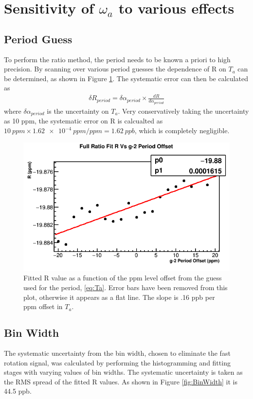 \section{Sensitivity of \texorpdfstring{$\omega_{a}$}{} to various effects}

	\subsection{\gmtwo Period Guess}

		To perform the ratio method, the \gmtwo period needs to be known a priori to high precision. By scanning over various \gmtwo period guesses the dependence of R on $T_{a}$ can be determined, as shown in Figure \ref{fig:gm2PeriodGuess}. The systematic error can then be calculated as 
			\begin{align}
				\delta R_{period} = \delta\alpha_{period} \times \frac{dR}{d\alpha_{period}}
			\end{align}
		where $\delta\alpha_{period}$ is the uncertainty on $T_{a}$. Very conservatively taking the uncertainty as 10 ppm, the systematic error on R is calcualted as $\SI{10}{ppm} \times \SI{1.62e-4}{ppm/ppm} = \SI{1.62}{ppb}$, which is completely negligible.

		\begin{figure}[H]
			\centering
			\includegraphics[width=.6\textwidth]{RatioCBO_R_Vs_gm2PeriodGuess_Canv}
		    \caption[gm2PeriodGuess]{Fitted R value as a function of the ppm level offset from the guess used for the \gmtwo period, \ref{eq:Ta}. Error bars have been removed from this plot, otherwise it appears as a flat line. The slope is .16 ppb per ppm offset in $T_{a}$.}
		    \label{fig:gm2PeriodGuess}
		\end{figure}


	\subsection{Bin Width}

		The systematic uncertainty from the bin width, chosen to eliminate the fast rotation signal, was calculated by performing the histogramming and fitting stages with varying values of bin widths. The systematic uncertainty is taken as the RMS spread of the fitted R values. As shown in Figure \ref{fig:BinWidth} it is 44.5 ppb.


